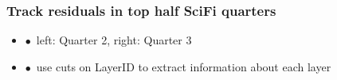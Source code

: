 \documentclass[aspectratio=1610, 12pt]{beamer}
\begin{document}
\begin{frame}\frametitle{Track residuals in top half SciFi quarters}
  \begin{itemize}
    \item $\bullet$\, left: Quarter 2, right: Quarter 3
    \item $\bullet$\, use cuts on LayerID to extract information about each layer
  \end{itemize}
  \begin{figure}
  \end{figure}
\end{frame}
\end{document}
